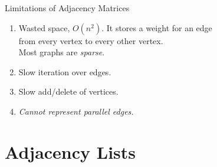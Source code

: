 \documentclass[14pt,aspectratio=1610]{beamer}
\begin{document}
\begin{frame}{Limitations of Adjacency Matrices}
  \begin{enumerate}[<+->]
    \item Wasted space, \(O(n^2)\). It stores a weight for an edge\\
      from every vertex to every other vertex. \\
      Most graphs are \textit{sparse}.
    \item Slow iteration over edges.
    \item Slow add/delete of vertices.
    \item \emph{Cannot represent parallel edges.}
  \end{enumerate}
\end{frame}

\section{Adjacency Lists}
\end{document}
